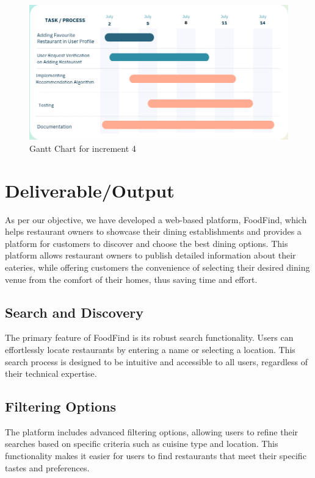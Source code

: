\documentclass[12pt, a4paper, oneside]{article}
\begin{document}
 \begin{figure}[h!]
	\includegraphics[width=\linewidth]{images/4.png}
	\centering
	\caption{Gantt Chart for increment 4}
	\label{fig:schedule4}
 \end{figure}
\clearpage
\pagebreak
\section{Deliverable/Output}

As per our objective, we have developed a web-based platform, FoodFind, which helps restaurant owners to showcase their dining establishments and provides a platform for customers to discover and choose the best dining options. This platform allows restaurant owners to publish detailed information about their eateries, while offering customers the convenience of selecting their desired dining venue from the comfort of their homes, thus saving time and effort.

\subsection{Search and Discovery}
The primary feature of FoodFind is its robust search functionality. Users can effortlessly locate restaurants by entering a name or selecting a location. This search process is designed to be intuitive and accessible to all users, regardless of their technical expertise.

\subsection{Filtering Options}
The platform includes advanced filtering options, allowing users to refine their searches based on specific criteria such as cuisine type and location. This functionality makes it easier for users to find restaurants that meet their specific tastes and preferences.
\end{document}
